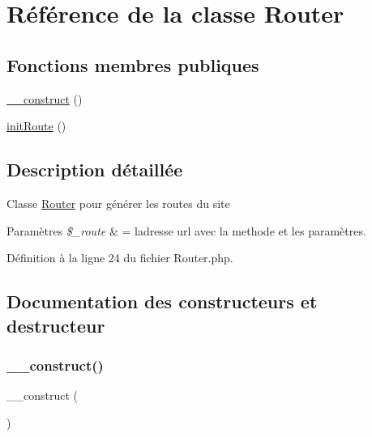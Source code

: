 \hypertarget{class_app_1_1_router}{}\section{Référence de la classe Router}
\label{class_app_1_1_router}
\subsection*{Fonctions membres publiques}
\begin{DoxyCompactItemize}
\item 
\hyperlink{class_app_1_1_router_a095c5d389db211932136b53f25f39685}{\+\_\+\+\_\+construct} ()
\item 
\hyperlink{class_app_1_1_router_a6fa8800727e8e7eeab56d569bfa3429b}{init\+Route} ()
\end{DoxyCompactItemize}


\subsection{Description détaillée}
Classe \hyperlink{class_app_1_1_router}{Router} pour générer les routes du site 
\begin{DoxyParams}{Paramètres}
{\em \$\+\_\+route} & = l\textquotesingle{}adresse url avec la methode et les paramètres. \\
\hline
\end{DoxyParams}


Définition à la ligne 24 du fichier Router.\+php.



\subsection{Documentation des constructeurs et destructeur}
\mbox{\label{class_app_1_1_router_a095c5d389db211932136b53f25f39685}} 
\subsubsection{\texorpdfstring{\+\_\+\+\_\+construct()}{\_\_construct()}}
{\footnotesize\ttfamily \+\_\+\+\_\+construct (\begin{DoxyParamCaption}{ }\end{DoxyParamCaption})}

